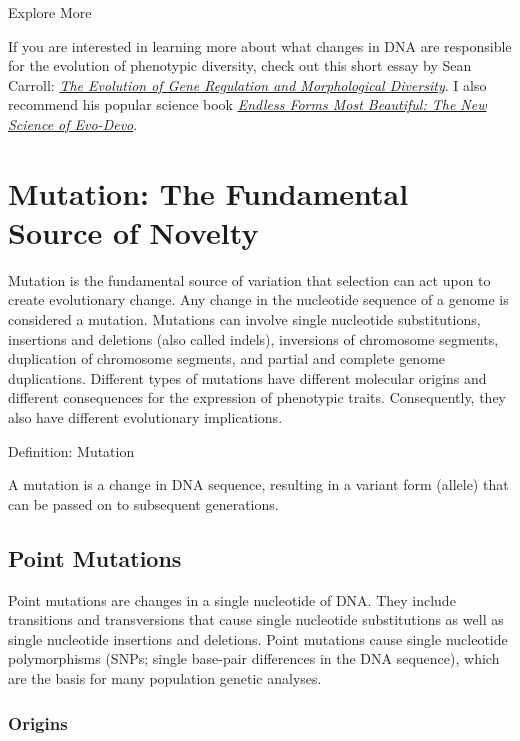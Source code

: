 \documentclass[
]{book}
\begin{document}
Explore More

If you are interested in learning more about what changes in DNA are responsible for the evolution of phenotypic diversity, check out this short essay by Sean Carroll: \href{https://www.cell.com/cell/fulltext/S0092-8674(00)80868-5}{\emph{The Evolution of Gene Regulation and Morphological Diversity}}. I also recommend his popular science book \href{https://www.amazon.com/Endless-Forms-Most-Beautiful-Science/dp/0393327795}{\emph{Endless Forms Most Beautiful: The New Science of Evo-Devo}}.

\hypertarget{mutation-the-fundamental-source-of-novelty}{%
\section{Mutation: The Fundamental Source of Novelty}\label{mutation-the-fundamental-source-of-novelty}}

Mutation is the fundamental source of variation that selection can act upon to create evolutionary change. Any change in the nucleotide sequence of a genome is considered a mutation. Mutations can involve single nucleotide substitutions, insertions and deletions (also called indels), inversions of chromosome segments, duplication of chromosome segments, and partial and complete genome duplications. Different types of mutations have different molecular origins and different consequences for the expression of phenotypic traits. Consequently, they also have different evolutionary implications.

Definition: Mutation

A mutation is a change in DNA sequence, resulting in a variant form (allele) that can be passed on to subsequent generations.

\hypertarget{point-mutations}{%
\subsection{Point Mutations}\label{point-mutations}}

Point mutations are changes in a single nucleotide of DNA. They include transitions and transversions that cause single nucleotide substitutions as well as single nucleotide insertions and deletions. Point mutations cause single nucleotide polymorphisms (SNPs; single base-pair differences in the DNA sequence), which are the basis for many population genetic analyses.

\hypertarget{origins}{%
\subsubsection*{Origins}\label{origins}}
\end{document}
